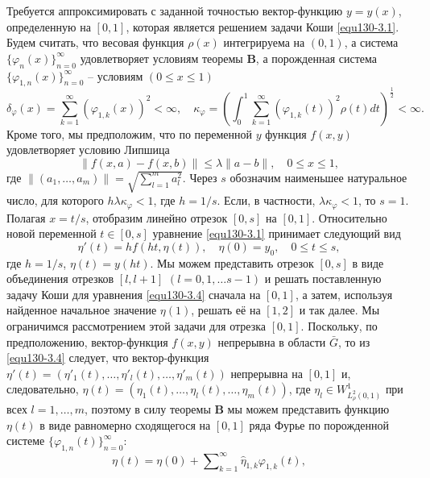 Требуется аппроксимировать с заданной точностью вектор-функцию $y=y(x)$, определенную на $[0,1]$, которая является решением задачи Коши \eqref{equ130-3.1}.
Будем считать, что весовая функция $\rho(x)$ интегрируема на $(0,1)$, а система $\{\varphi_{n}(x)\}_{n=0}^\infty$ удовлетворяет условиям теоремы \textbf{ B}, а порожденная система $\{\varphi_{1,n}(x)\}_{n=0}^\infty$ -- условиям $(0\le x\le 1)$
\begin{equation}\label{equ130-3.2}
\delta_\varphi(x)=\sum_{k=1}^{\infty}(\varphi_{1,k}(x))^2<\infty,\quad
\kappa_{\varphi}=\left(\int_0^1\sum_{k=1}^{\infty}
(\varphi_{1,k}(t))^2\rho(t)dt\right)^{\frac12}<\infty.
\end{equation}
Кроме того, мы предположим, что по переменной $y$ функция $f(x,y)$ удовлетворяет условию Липшица
 \begin{equation}\label{equ130-3.3}
\|f(x,a)-f(x,b)\|\le \lambda\|a-b\|, \quad 0\le x \le 1,
\end{equation}
где $\|(a_1,\ldots,a_m)\|=\sqrt{\sum_{l=1}^ma_l^2}$. Через $s$ обозначим наименьшее натуральное число, для которого $h\lambda\kappa_\varphi<1$, где $h=1/s$. Если, в частности, $\lambda\kappa_\varphi<1$, то $s=1$. Полагая $x=t/s$, отобразим линейно отрезок $[0,s]$ на $[0,1]$. Относительно новой переменной $t\in [0,s]$ уравнение \eqref{equ130-3.1} принимает следующий вид
\begin{equation}\label{equ130-3.4}
\eta'(t)=hf(ht,\eta(t)), \quad \eta(0)=y_0,\quad 0\le t\le s,
\end{equation}
где $h=1/s$, $\eta(t)=y(ht)$. Мы можем представить отрезок $[0,s]$ в виде объединения отрезков $[l,l+1]$ $(l=0,1,\ldots s-1)$ и  решать поставленную задачу Коши для уравнения \eqref{equ130-3.4} сначала на $[0,1]$, а затем, используя найденное начальное значение $\eta(1)$,  решать её на $[1,2]$ и так далее. Мы ограничимся рассмотрением этой задачи для отрезка $[0,1]$. Поскольку, по предположению, вектор-функция $f(x,y)$ непрерывна в области $\bar G$, то из \eqref{equ130-3.4} следует, что  вектор-функция $\eta'(t)=(\eta'_1(t),\ldots,\eta'_l(t),\ldots,\eta'_m(t))$ непрерывна на $[0,1]$ и, следовательно, $\eta(t)=(\eta_1(t),\ldots,\eta_l(t),\ldots,\eta_m(t))$, где $\eta_l\in W_{L_\rho^2(0,1)}^1$ при всех $l=1,\ldots,m$, поэтому в силу теоремы \textbf{ B}  мы можем представить  функцию $\eta(t)$ в виде равномерно сходящегося на $[0,1]$ ряда Фурье по порожденной системе $\{\varphi_{1,n}(t)\}_{n=0}^\infty$:
\begin{equation}\label{equ130-3.5}
\eta(t)= \eta(0)+ \sum\nolimits_{k=1}^\infty \hat \eta_{1,k}\varphi_{1,k}(t),
\end{equation}
